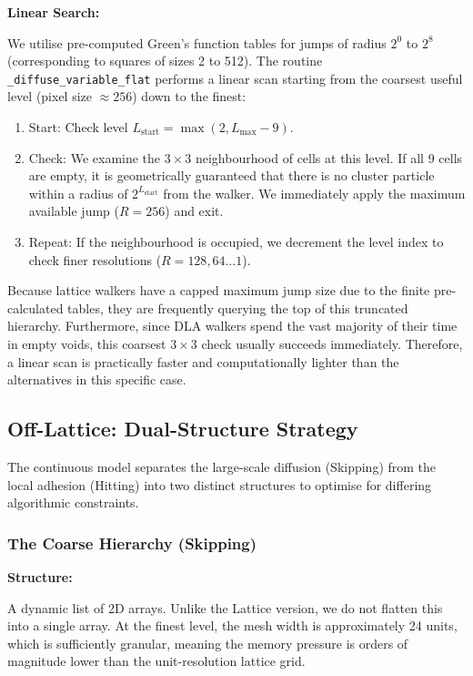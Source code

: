 \documentclass[12pt, a4paper, oneside]{report}
\theoremstyle{remark}
\begin{document}
\noindent \textbf{Linear Search:}

We utilise pre-computed Green's function tables for jumps of radius $2^0$ to $2^8$ (corresponding to squares of sizes 2 to 512). The routine \texttt{\_diffuse\_variable\_flat} performs a linear scan starting from the coarsest useful level (pixel size $\approx 256$) down to the finest:
\begin{enumerate}
    \item Start: Check level $L_{\text{start}} = \max(2, L_{\text{max}} - 9)$.
    \item Check: We examine the $3 \times 3$ neighbourhood of cells at this level. If all 9 cells are empty, it is geometrically guaranteed that there is no cluster particle within a radius of $2^{L_{\text{start}}}$ from the walker. We immediately apply the maximum available jump ($R=256$) and exit.
    \item Repeat: If the neighbourhood is occupied, we decrement the level index to check finer resolutions ($R=128, 64 \dots 1$).
\end{enumerate}

Because lattice walkers have a capped maximum jump size due to the finite pre-calculated tables, they are frequently querying the top of this truncated hierarchy. Furthermore, since DLA walkers spend the vast majority of their time in empty voids, this coarsest $3 \times 3$ check usually succeeds immediately. Therefore, a linear scan is practically faster and computationally lighter than the alternatives in this specific case.

\subsection{Off-Lattice: Dual-Structure Strategy}
The continuous model separates the large-scale diffusion (Skipping) from the local adhesion (Hitting) into two distinct structures to optimise for differing algorithmic constraints.

\subsubsection{The Coarse Hierarchy (Skipping)}
\noindent \textbf{Structure:} 

A dynamic list of 2D arrays. Unlike the Lattice version, we do not flatten this into a single array. At the finest level, the mesh width is approximately 24 units, which is sufficiently granular, meaning the memory pressure is orders of magnitude lower than the unit-resolution lattice grid.
\end{document}
